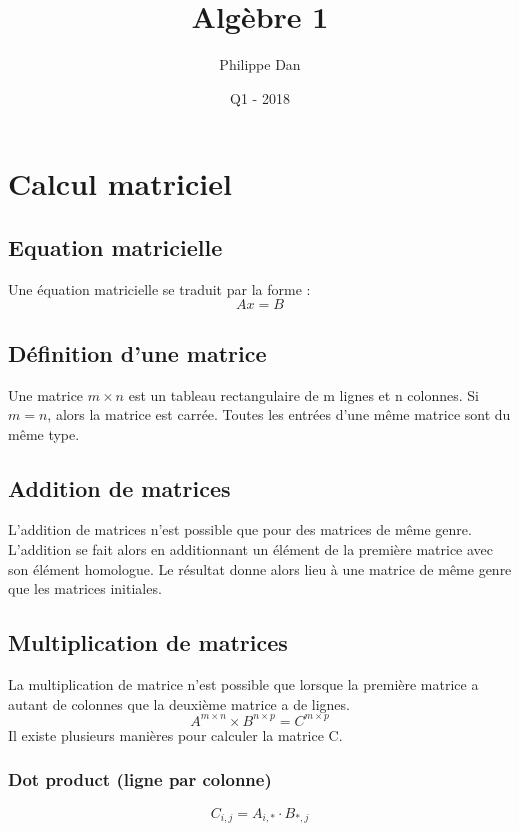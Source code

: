 \documentclass[a4paper]{book}
\begin{document}
\pagestyle{fancy}
\lhead{\rightmark }
\chead{}
\rhead{\leftmark}
\rfoot{\thepage}

\title{ Algèbre 1 }
\author{Philippe Dan}
\date{Q1 - 2018}

\maketitle
\tableofcontents

\chapter{Calcul matriciel}
\section{Equation matricielle}
Une équation matricielle se traduit par la forme :
\begin{equation}
    Ax = B
\end{equation}
\section{Définition d'une matrice}
Une matrice $m\times n$ est un tableau rectangulaire de m lignes et n colonnes. Si $m=n$, alors la matrice est carrée. Toutes les entrées d'une même matrice sont du même type.
\section{Addition de matrices}
L'addition de matrices n'est possible que pour des matrices de même genre. L'addition se fait alors en additionnant un élément de la première matrice avec son élément homologue. Le résultat donne alors lieu à une matrice de même genre que les matrices initiales.
\section{Multiplication de matrices}
La multiplication de matrice n'est possible que lorsque la première matrice a autant de colonnes que la deuxième matrice a de lignes.
\begin{equation}
    A^{m\times n} \times B^{n\times p} = C^{m\times p}
\end{equation}
Il existe plusieurs manières pour calculer la matrice C.
\subsection{Dot product (ligne par colonne)}
\begin{equation}
    C_{i,j} = A_{i,*} \cdot B_{*,j}
\end{equation}
\end{document}
